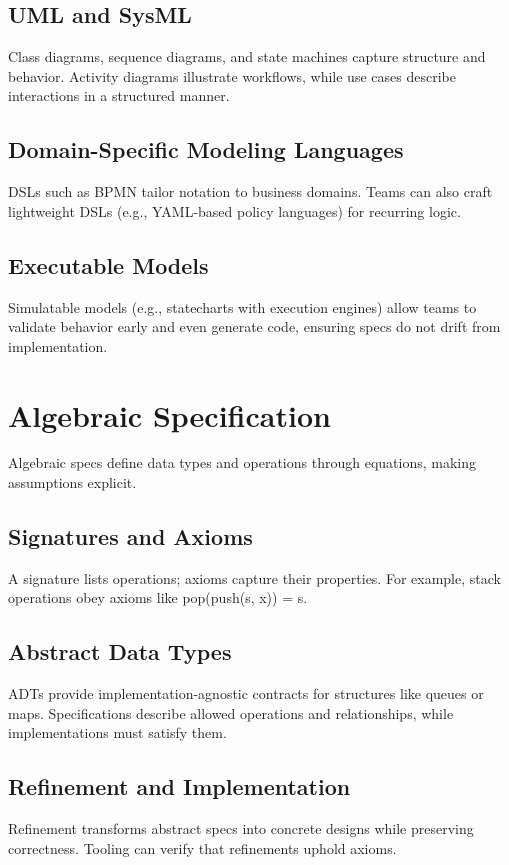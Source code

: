 \subsection{UML and SysML}
Class diagrams, sequence diagrams, and state machines capture structure and behavior. Activity diagrams illustrate workflows, while use cases describe interactions in a structured manner.

\subsection{Domain-Specific Modeling Languages}
DSLs such as BPMN tailor notation to business domains. Teams can also craft lightweight DSLs (e.g., YAML-based policy languages) for recurring logic.

\subsection{Executable Models}
Simulatable models (e.g., statecharts with execution engines) allow teams to validate behavior early and even generate code, ensuring specs do not drift from implementation.

\section{Algebraic Specification}
\label{sec:algebraic}

Algebraic specs define data types and operations through equations, making assumptions explicit.

\subsection{Signatures and Axioms}
A signature lists operations; axioms capture their properties. For example, stack operations obey axioms like pop(push(s, x)) = s.

\subsection{Abstract Data Types}
ADTs provide implementation-agnostic contracts for structures like queues or maps. Specifications describe allowed operations and relationships, while implementations must satisfy them.

\subsection{Refinement and Implementation}
Refinement transforms abstract specs into concrete designs while preserving correctness. Tooling can verify that refinements uphold axioms.

